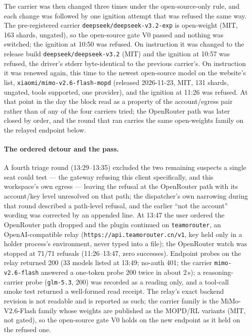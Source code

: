 \documentclass[11pt,a4paper]{article}
\begin{document}
The carrier was then changed three times under the open-source-only rule, and each change was followed by one ignition attempt that was refused the same way. The pre-registered carrier \texttt{deepseek/deepseek-v3.2-exp} is open-weight (MIT, 163 shards, ungated), so the open-source gate V0 passed and nothing was switched; the ignition at 10:50 was refused. On instruction it was changed to the release build \texttt{deepseek/deepseek-v3.2} (MIT) and the ignition at 10:57 was refused, the driver's stderr byte-identical to the previous carrier's. On instruction it was renewed again, this time to the newest open-source model on the website's list, \texttt{xiaomi/mimo-v2.6-flash-mopd} (released 2026-11-23, MIT, 131 shards, ungated, tools supported, one provider), and the ignition at 11:26 was refused. At that point in the day the block read as a property of the account/egress pair rather than of any of the four carriers tried; the OpenRouter path was later closed by order, and the round that ran carries the same open-weights family on the relayed endpoint below.

\paragraph{The ordered detour and the pass.}
A fourth triage round (13:29--13:35) excluded the two remaining suspects a single seat could test --- the gateway refusing this client specifically, and this workspace's own egress --- leaving the refusal at the OpenRouter path with its account/key level unresolved on that path; the dispatcher's own narrowing during that round described a path-level refusal, and the earlier ``not the account'' wording was corrected by an appended line. At 13:47 the user ordered the OpenRouter path dropped and the plugin continued on \texttt{teamorouter}, an OpenAI-compatible relay (\texttt{https://api.teamorouter.cn/v1}, key held only in a holder process's environment, never typed into a file); the OpenRouter watch was stopped at 71/71 refusals (11:26--13:47, zero successes). Endpoint probes on the relay returned 200 (33 models listed at 13:49; no-auth 401; the carrier \texttt{mimo-v2.6-flash} answered a one-token probe 200 twice in about 2\,s); a reasoning-carrier probe (\texttt{glm-5.3}, 200) was recorded as a reading only, and a tool-call smoke test returned a well-formed read receipt. The relay's exact backend revision is not readable and is reported as such; the carrier family is the MiMo-V2.6-Flash family whose weights are published as the MOPD/RL variants (MIT, not gated), so the open-source gate V0 holds on the new endpoint as it held on the refused one.
\end{document}
